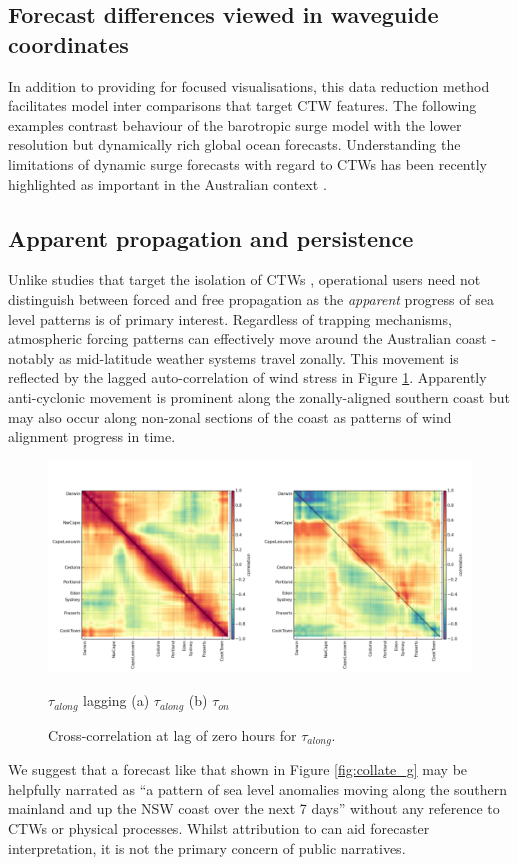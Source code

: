 \subsection{Forecast differences viewed in waveguide coordinates}

In addition to providing for focused visualisations, this data reduction method facilitates model inter comparisons that target CTW features.
The following examples contrast behaviour of the barotropic surge model with the lower resolution but dynamically rich global ocean forecasts.
Understanding the limitations of dynamic surge forecasts with regard to CTWs has been recently highlighted as important in the Australian context \citep{Hetzel:2018hh}.   


\subsection{Apparent propagation and persistence}
Unlike studies that target the isolation of CTWs \citep{Maiwa:2010tk}, operational users need not distinguish between forced and free propagation as the \emph{apparent} progress of sea level patterns is of primary interest.
Regardless of trapping mechanisms, atmospheric forcing patterns can effectively move around the Australian coast - notably as mid-latitude weather systems travel zonally. 
This movement is reflected by the lagged auto-correlation of wind stress in Figure \ref{fig:Clag0U}.
Apparently anti-cyclonic movement is prominent along the zonally-aligned southern coast but may also occur along non-zonal sections of the coast as patterns of wind alignment progress in time. 
\begin{figure}[!hbt] \centering
    \includegraphics[width=\figwidthFull]{figures/plots/concatC_U_gstr_lag_000.png}
    \caption{Cross-correlation at lag of zero hours for $\tau_{along}$.}
    {$\tau_{along}$ lagging (a) $\tau_{along}$ (b) $\tau_{on}$}
    \label{fig:Clag0U}
\end{figure}
We suggest that a forecast like that shown in Figure \ref{fig:collate_g} may be helpfully narrated as ``a pattern of sea level anomalies moving along the southern mainland and up the NSW coast over the next 7 days'' without any reference to CTWs or physical processes.
Whilst attribution to can aid forecaster interpretation, it is not the primary concern of public narratives.   
 
